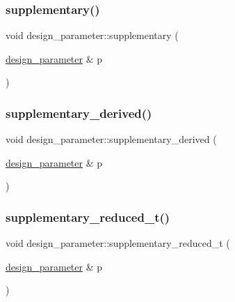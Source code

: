 \mbox{\label{classdesign__parameter_a92bc4ea249ac3cdedbf77566410acd5a}} 
\subsubsection{\texorpdfstring{supplementary()}{supplementary()}}
{\footnotesize\ttfamily void design\+\_\+parameter\+::supplementary (\begin{DoxyParamCaption}\item[{\mbox{\hyperlink{classdesign__parameter}{design\+\_\+parameter}} \&}]{p }\end{DoxyParamCaption})}

\mbox{\label{classdesign__parameter_a17941dd86d09c510322cd0deee7e463f}} 
\subsubsection{\texorpdfstring{supplementary\+\_\+derived()}{supplementary\_derived()}}
{\footnotesize\ttfamily void design\+\_\+parameter\+::supplementary\+\_\+derived (\begin{DoxyParamCaption}\item[{\mbox{\hyperlink{classdesign__parameter}{design\+\_\+parameter}} \&}]{p }\end{DoxyParamCaption})}

\mbox{\label{classdesign__parameter_ace491a14da6337d02eb91fd090c72345}} 
\subsubsection{\texorpdfstring{supplementary\+\_\+reduced\+\_\+t()}{supplementary\_reduced\_t()}}
{\footnotesize\ttfamily void design\+\_\+parameter\+::supplementary\+\_\+reduced\+\_\+t (\begin{DoxyParamCaption}\item[{\mbox{\hyperlink{classdesign__parameter}{design\+\_\+parameter}} \&}]{p }\end{DoxyParamCaption})}

